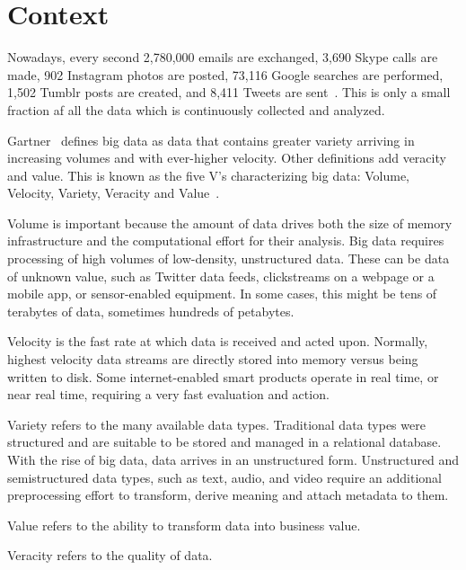 \section{Context}\label{sec:context}
Nowadays, every second 2,780,000 emails are exchanged, 3,690 Skype calls are made, 902 Instagram photos are posted, 73,116 Google searches are performed, 1,502 Tumblr posts are created, and 8,411 Tweets are sent~\cite{misc:InternetLiveStats}. This is only a small fraction af all the data which is continuously collected and analyzed.

Gartner~\cite{Gartner} defines big data as data that contains greater variety arriving in increasing volumes and with ever-higher velocity. Other definitions add veracity and value. This is known as the five V's characterizing big data: Volume, Velocity, Variety, Veracity and Value~\cite{WhatIsBigData}.

Volume is important because the amount of data drives both the size of memory infrastructure  and the computational effort for their analysis. Big data requires processing of high volumes of low-density, unstructured data. These can be data of unknown value, such as Twitter data feeds, clickstreams on a webpage or a mobile app, or sensor-enabled equipment. In some cases, this might be tens of terabytes of data, sometimes hundreds of petabytes. 

Velocity is the fast rate at which data is received and acted upon. Normally, highest velocity data streams are directly stored into memory versus being written to disk. Some internet-enabled smart products operate in real time, or near real time, requiring a very fast evaluation and action. 

Variety refers to the many available data types. Traditional data types were structured and are suitable to be stored and managed in a relational database. With the rise of big data, data arrives in an unstructured form. Unstructured and semistructured data types, such as text, audio, and video require an additional preprocessing effort to transform, derive meaning and attach metadata to them. 

Value refers to the ability to transform data into business value.

Veracity refers to the quality of data.




